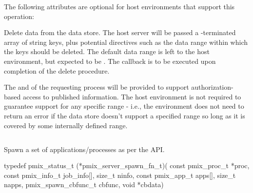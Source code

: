 
\reqattrend

\optattrstart
The following attributes are optional for host environments that support this operation:


\optattrend

\descr

Delete data from the data store.
The host server will be passed a -terminated array of string keys, plus potential directives such as the data range within which the keys should be deleted. The default data range is left to the host environment, but expected to be .
The callback is to be executed upon completion of the delete procedure.

\advicermstart
The  and  of the requesting process will be provided to support authorization-based access to published information. The host environment is not required to guarantee support for any specific range - i.e., the environment does not need to return an error if the data store doesn't support a specified range so long as it is covered by some internally defined range.
\advicermend


\subsection{}

\summary

Spawn a set of applications/processes as per the  API.

\format

\cspecificstart
\begin{codepar}
typedef pmix_status_t (*pmix_server_spawn_fn_t)(
                             const pmix_proc_t *proc,
                             const pmix_info_t job_info[],
                             size_t ninfo,
                             const pmix_app_t apps[],
                             size_t napps,
                             pmix_spawn_cbfunc_t cbfunc,
                             void *cbdata)
\end{codepar}
\cspecificend

\begin{arglist}
\end{arglist}

